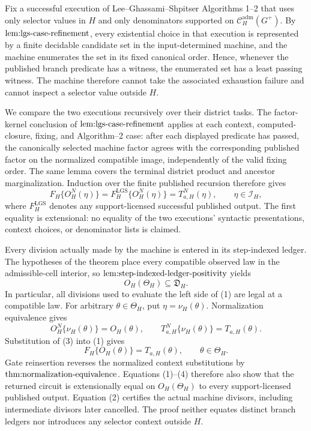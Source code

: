Fix a successful execution of Lee--Ghassami--Shpitser Algorithms 1--2 that uses only selector values in \(H\) and only denominators supported on \(\mathcal C_H^{\mathrm{adm}}(G^+)\).  By \(\textnormal{lem:lgs-case-refinement}\), every existential choice in that execution is represented by a finite decidable candidate set in the input-determined machine, and the machine enumerates the set in its fixed canonical order.  Hence, whenever the published branch predicate has a witness, the enumerated set has a least passing witness.  The machine therefore cannot take the associated exhaustion failure and cannot inspect a selector value outside \(H\).

We compare the two executions recursively over their district tasks.  The factor-kernel conclusion of \(\textnormal{lem:lgs-case-refinement}\) applies at each context, computed-closure, fixing, and Algorithm--2 case: after each displayed predicate has passed, the canonically selected machine factor agrees with the corresponding published factor on the normalized compatible image, independently of the valid fixing order.  The same lemma covers the terminal district product and ancestor marginalization.  Induction over the finite published recursion therefore gives
\[
 F_H\{O_H^N(\eta)\}=F_H^{\mathrm{LGS}}\{O_H^N(\eta)\}
 =T_{a,H}^N(\eta),
 \qquad \eta\in\mathcal I_H,
\tag{1}
\]
where \(F_H^{\mathrm{LGS}}\) denotes any support-licensed successful published output.  The first equality is extensional: no equality of the two executions' syntactic presentations, context choices, or denominator lists is claimed.

Every division actually made by the machine is entered in its step-indexed ledger.  The hypotheses of the theorem place every compatible observed law in the admissible-cell interior, so \(\textnormal{lem:step-indexed-ledger-positivity}\) yields
\[
 O_H(\Theta_H)\subseteq\mathfrak D_H.
\tag{2}
\]
In particular, all divisions used to evaluate the left side of (1) are legal at a compatible law.  For arbitrary \(\theta\in\Theta_H\), put \(\eta=\nu_H(\theta)\).  Normalization equivalence gives
\[
 O_H^N\{\nu_H(\theta)\}=O_H(\theta),
 \qquad
 T_{a,H}^N\{\nu_H(\theta)\}=T_{a,H}(\theta).
\tag{3}
\]
Substitution of (3) into (1) gives
\[
 F_H\{O_H(\theta)\}=T_{a,H}(\theta),
 \qquad \theta\in\Theta_H.
\tag{4}
\]
Gate reinsertion reverses the normalized context substitutions by \(\textnormal{thm:normalization-equivalence}\).  Equations (1)--(4) therefore also show that the returned circuit is extensionally equal on \(O_H(\Theta_H)\) to every support-licensed published output.  Equation (2) certifies the actual machine divisors, including intermediate divisors later cancelled.  The proof neither equates distinct branch ledgers nor introduces any selector context outside \(H\).

